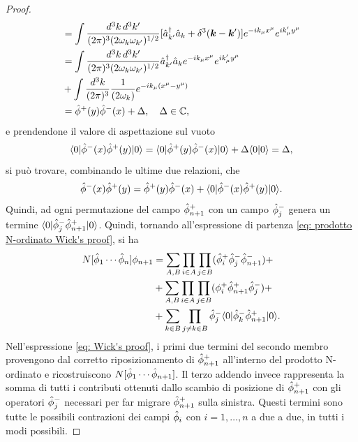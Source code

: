 \begin{proof}
\begin{equation}
\begin{split}
            &= \int\frac{d^3k\,d^3k'}{(2\pi)^3(2\omega_k\omega_{k'})^{1/2}}[\hat{a}^\dagger_{k'}\hat{a}_k + \delta^3(\bm{k} - \bm{k}')]e^{-ik_\mu x^\mu}e^{ik'_\mu y^\mu} \\
            &= \int\frac{d^3k\,d^3k'}{(2\pi)^3(2\omega_k\omega_{k'})^{1/2}}\hat{a}^\dagger_{k'}\hat{a}_ke^{-ik_\mu x^\mu}e^{ik'_\mu y^\mu} \\
            &+ \int\frac{d^3k}{(2\pi)^3}\frac{1}{(2\omega_k)}e^{-ik_\mu(x^\mu - y^\mu)}\\
            &=\hat{\phi}^+(y)\hat{\phi}^-(x) + \Delta,\quad \Delta\in\mathbb{C},
        \end{split}
    \end{equation}
    e prendendone il valore di aspettazione sul vuoto
    \begin{equation}
        \langle 0 | \hat{\phi}^-(x)\hat{\phi}^+(y) | 0 \rangle = \langle 0 | \hat{\phi}^+(y)\hat{\phi}^-(x) | 0 \rangle + \Delta\langle 0 | 0 \rangle = \Delta,
    \end{equation}
    si può trovare, combinando le ultime due relazioni, che
    \begin{equation}
        \hat{\phi}^-(x)\hat{\phi}^+(y) = \hat{\phi}^+(y)\hat{\phi}^-(x) + \langle 0 | \hat{\phi}^-(x)\hat{\phi}^+(y) | 0 \rangle.
    \end{equation}
    Quindi, ad ogni permutazione del campo $\hat{\phi}^+_{n+1}$ con un campo $\hat{\phi}^-_j$ genera un termine $\langle 0 | \hat{\phi}^-_j\hat{\phi}^+_{n+1} | 0 \rangle$. Quindi, tornando all'espressione di partenza \eqref{eq: prodotto N-ordinato Wick's proof}, si ha
    \begin{equation}
    \label{eq: Wick's proof}
        \begin{split}
            N[\hat{\phi}_1\cdots\hat{\phi}_n]\phi_{n+1} &= \sum_{A,B}\prod_{i\in A}\prod_{j\in B}(\hat{\phi}^+_i\hat{\phi}^-_j\hat{\phi}^-_{n+1}) + \\
            &+ \sum_{A,B}\prod_{i\in A}\prod_{j\in B}(\phi^+_i\hat{\phi}^+_{n+1}\hat{\phi}^-_j) + \\
            &+ \sum_{k\in B}\prod_{j\neq k\in B}\hat{\phi}^-_j\langle 0 | \hat{\phi}_k^-\hat{\phi}_{n+1}^+ | 0 \rangle.
        \end{split}
    \end{equation}
    Nell'espressione \eqref{eq: Wick's proof}, i primi due termini del secondo membro provengono dal corretto riposizionamento di $\hat{\phi}^+_{n+1}$ all'interno del prodotto N-ordinato e ricostruiscono $ N[\hat{\phi}_1\cdots\hat{\phi}_{n+1}]$. Il terzo addendo invece rappresenta la somma di tutti i contributi ottenuti dallo scambio di posizione di $\hat{\phi}^+_{n+1}$ con gli operatori $\hat{\phi}^-_j$ necessari per far migrare $\hat{\phi}^+_{n+1}$ sulla sinistra. Questi termini sono tutte le possibili contrazioni dei campi $\hat{\phi}_i$ con $i=1,\dots,n$ a due a due, in tutti i modi possibili.
\end{proof}
